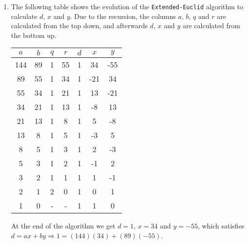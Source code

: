 \documentclass{article}
\begin{document}
\begin{enumerate}[1.]
    \item The following table shows the evolution of the \texttt{Extended-Euclid} algorithm to calculate $d$, $x$ and $y$. Due to the recursion, the columns $a$, $b$, $q$ and $r$ are calculated from the top down, and afterwards $d$, $x$ and $y$ are calculated from the bottom up.
	\begin{table}[ht]
		\centering
		\begin{tabular}{ccccccc}
			\toprule
			$a$ & $b$ & $q$ & $r$ & $d$ & $x$ & $y$ \\
			\midrule
            144 & 89 & 1 & 55 & 1 & 34 & -55 \\
            89 & 55 & 1 & 34 & 1 & -21 & 34 \\
            55 & 34 & 1 & 21 & 1 & 13 & -21 \\
            34 & 21 & 1 & 13 & 1 & -8 & 13 \\
            21 & 13 & 1 & 8 & 1 & 5 & -8 \\
            13 & 8 & 1 & 5 & 1 & -3 & 5 \\
            8 & 5 & 1 & 3 & 1 & 2 & -3 \\
            5 & 3 & 1 & 2 & 1 & -1 & 2 \\
            3 & 2 & 1 & 1 & 1 & 1 & -1 \\
            2 & 1 & 2 & 0 & 1 & 0 & 1 \\
            1 & 0 & - & - & 1 & 1 & 0 \\
			\bottomrule
		\end{tabular}
    \end{table}
    
    At the end of the algorithm we get $d = 1$, $x = 34$ and $y = -55$, which satisfies $d = ax + by \Rightarrow 1 = (144)(34) + (89)(-55)$.
    

\end{enumerate}
\end{document}
